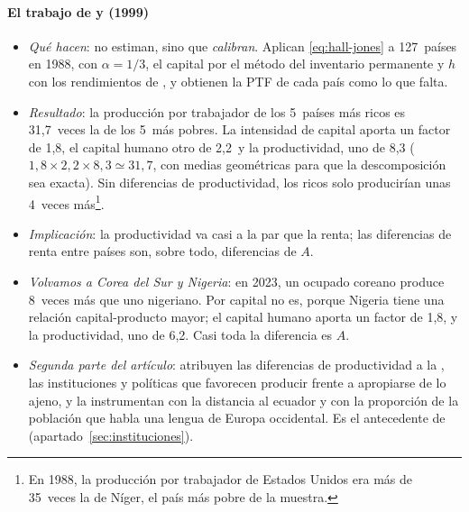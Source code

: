 \documentclass[11pt]{article}
\begin{document}
\paragraph{El trabajo de  y  (1999)}

\begin{itemize}
\item \emph{Qué hacen}: no estiman, sino que \emph{calibran}. Aplican \eqref{eq:hall-jones} a 127~países en 1988, con $\alpha=1/3$, el capital por el método del inventario permanente y $h$ con los rendimientos de , y obtienen la PTF de cada país como lo que falta\nocite{HallJones1999Why}.
\item \emph{Resultado}: la producción por trabajador de los 5~países más ricos es 31,7~veces la de los 5~más pobres. La intensidad de capital aporta un factor de 1,8, el capital humano otro de 2,2~y la productividad, uno de 8,3 ($1{,}8\times2{,}2\times8{,}3\simeq31{,}7$, con medias geométricas para que la descomposición sea exacta). Sin diferencias de productividad, los ricos solo producirían unas 4~veces más\nocite{HallJones1999Why}\footnote{En 1988, la producción por trabajador de Estados Unidos era más de 35~veces la de Níger, el país más pobre de la muestra\nocite{HallJones1999Why}.}.
\item \emph{Implicación}: la productividad va casi a la par que la renta; las diferencias de renta entre países son, sobre todo, diferencias de $A$.
\item \emph{Volvamos a Corea del Sur y Nigeria}: en 2023, un ocupado coreano produce 8~veces más que uno nigeriano. Por capital no es, porque Nigeria tiene una relación capital-producto mayor; el capital humano aporta un factor de 1,8, y la productividad, uno de 6,2. Casi toda la diferencia es $A$\nocite{GGDC2025PWT}.
\item \emph{Segunda parte del artículo}: atribuyen las diferencias de productividad a la , las instituciones y políticas que favorecen producir frente a apropiarse de lo ajeno, y la instrumentan con la distancia al ecuador y con la proporción de la población que habla una lengua de Europa occidental. Es el antecedente de \textcite{AcemogluJohnsonRobinson2001Colonial} (apartado~\ref{sec:instituciones}).
\end{itemize}
\end{document}
